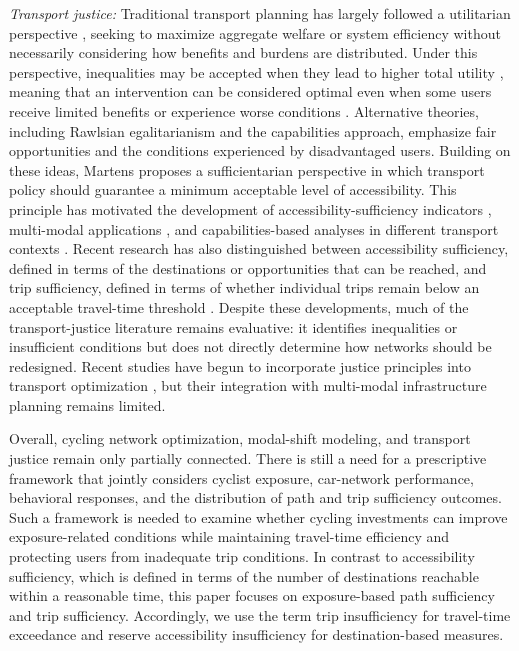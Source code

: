 \documentclass[lettersize,journal]{IEEEtran}
\begin{document}
\textit{Transport justice:}
Traditional transport planning has largely followed a utilitarian perspective \cite{mill2016utilitarianism}, seeking to maximize aggregate welfare or system efficiency without necessarily considering how benefits and burdens are distributed. Under this perspective, inequalities may be accepted when they lead to higher total utility \cite{binmore1998egalitarianism}, meaning that an intervention can be considered optimal even when some users receive limited benefits or experience worse conditions \cite{pereira2017distributive}. Alternative theories, including Rawlsian egalitarianism \cite{rawls1971theory} and the capabilities approach, emphasize fair opportunities and the conditions experienced by disadvantaged users. Building on these ideas, Martens \cite{martens2017transport} proposes a sufficientarian perspective in which transport policy should guarantee a minimum acceptable level of accessibility. This principle has motivated the development of accessibility-sufficiency indicators \cite{martens2022equity}, multi-modal applications \cite{salazar2024accessibility}, and capabilities-based analyses in different transport contexts \cite{amorim2024comparing}. Recent research has also distinguished between accessibility sufficiency, defined in terms of the destinations or opportunities that can be reached, and trip sufficiency, defined in terms of whether individual trips remain below an acceptable travel-time threshold \cite{salazar2025mobilizing}. Despite these developments, much of the transport-justice literature remains evaluative: it identifies inequalities or insufficient conditions but does not directly determine how networks should be redesigned. Recent studies have begun to incorporate justice principles into transport optimization \cite{salazar2024accessibility,salazar2025mobilizing,jurado2025transport, qiu2025multi}, but their integration with multi-modal infrastructure planning remains limited.

Overall, cycling network optimization, modal-shift modeling, and transport justice remain only partially connected. There is still a need for a prescriptive framework that jointly considers cyclist exposure, car-network performance, behavioral responses, and the distribution of path and trip sufficiency outcomes. Such a framework is needed to examine whether cycling investments can improve exposure-related conditions while maintaining travel-time efficiency and protecting users from inadequate trip conditions. In contrast to accessibility sufficiency, which is defined in terms of the number of destinations reachable within a reasonable time, this paper focuses on exposure-based path sufficiency and trip sufficiency. Accordingly, we use the term trip insufficiency for travel-time exceedance and reserve accessibility insufficiency for destination-based measures.
\end{document}
